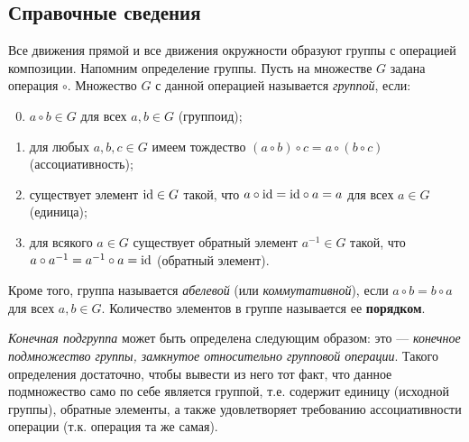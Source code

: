\subsection*{Справочные сведения}

Все движения прямой и все движения окружности образуют группы с операцией композиции. Напомним определение группы.
Пусть на множестве $G$ задана операция $\circ$. Множество $G$ с данной операцией называется \textit{группой}, если:
\begin{enumerate}[G1]
\setcounter{enumi}{-1}
\item $a\circ b\in G$ для всех $a,b\in G$ (группоид);
\item для любых $a,b,c\in G$ имеем тождество $(a\circ b)\circ c=a\circ (b\circ c)$ (ассоциативность);
\item существует элемент $\mathrm{id}\in G$ такой, что $a\circ \mathrm{id}=\mathrm{id}\circ a=a$ для всех $a\in G$ (единица);
\item для всякого $a\in G$ существует обратный элемент $a^{-1}\in G$ такой, что $a\circ a^{-1}=a^{-1}\circ a=\mathrm{id}$ (обратный элемент).
\end{enumerate}

Кроме того, группа называется \textit{абелевой} (или \textit{коммутативной}), если $a\circ b=b\circ a$ для всех $a,b\in G$. Количество элементов в группе называется ее \textbf{порядком}.

\textit{Конечная подгруппа} может быть определена следующим образом: это --- \textit{конечное подмножество группы, замкнутое относительно групповой операции}. Такого определения достаточно, чтобы вывести из него тот факт, что данное подмножество само по себе является группой, т.е. содержит единицу (исходной группы), обратные элементы, а также удовлетворяет требованию ассоциативности операции (т.к. операция та же самая).

